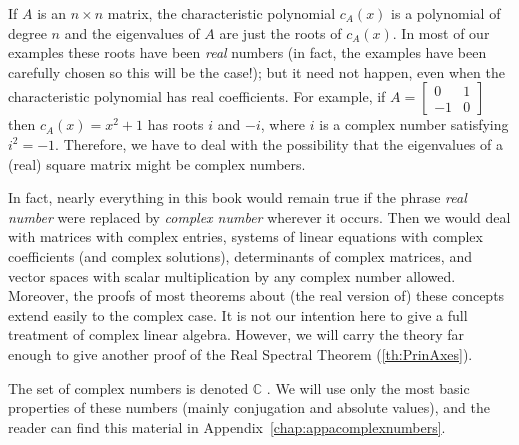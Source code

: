 \documentclass{ximera}
\begin{document}
\begin{abstract}
\end{abstract}
\maketitle

If $A$ is an $n \times n$ matrix, the characteristic polynomial $c_{A}(x)$ is a polynomial of degree $n$ and the eigenvalues of $A$ are just the roots of $c_{A}(x)$. In most of our examples these roots have been \textit{real} numbers (in fact, the examples have been carefully chosen so this will be the case!); but it need not happen, even when the characteristic polynomial has real coefficients. For example, if $A = \left[ \begin{array}{rr}
0 & 1 \\
-1 & 0
\end{array}\right]$ then $c_{A}(x) = x^{2} + 1$ has roots $i$ and $-i$, where $i$ is a complex number satisfying $i^{2} = -1$. Therefore, we have to deal with the possibility that the eigenvalues of a (real) square matrix might be complex numbers.

In fact, nearly everything in this book would remain true if the phrase \textit{real number} were replaced by \textit{complex number}
 wherever it occurs. Then we would deal with matrices with complex
entries, systems of linear equations with complex coefficients (and
complex solutions), determinants of complex matrices, and vector spaces
with scalar multiplication by any complex number allowed. Moreover, the
proofs of most theorems about (the real version of) these concepts
extend easily to the complex case. It is not our intention here to give a
 full treatment of complex linear algebra. However, we will carry the
theory far enough to give another proof of the Real Spectral Theorem (\ref{th:PrinAxes}).

The set of complex numbers is denoted $\mathbb{C}$ . We will use only the most basic properties of these numbers (mainly conjugation and absolute values), and the reader can find this material in Appendix~\ref{chap:appacomplexnumbers}.
\end{document}
